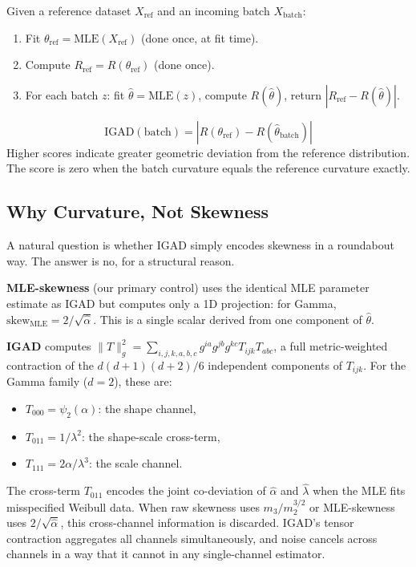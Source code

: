 \documentclass[12pt]{article}
\begin{document}
Given a reference dataset $X_{\mathrm{ref}}$ and an incoming batch
$X_{\mathrm{batch}}$:
\begin{enumerate}
  \item Fit $\theta_{\mathrm{ref}} = \mathrm{MLE}(X_{\mathrm{ref}})$ (done once, at fit time).
  \item Compute $R_{\mathrm{ref}} = R(\theta_{\mathrm{ref}})$ (done once).
  \item For each batch $z$: fit $\hat{\theta} = \mathrm{MLE}(z)$, compute
        $R(\hat{\theta})$, return $|R_{\mathrm{ref}} - R(\hat{\theta})|$.
\end{enumerate}
\[
  \boxed{\mathrm{IGAD}(\text{batch}) = |R(\theta_{\mathrm{ref}}) - R(\hat{\theta}_{\mathrm{batch}})|}
\]
Higher scores indicate greater geometric deviation from the reference
distribution. The score is zero when the batch curvature equals the reference
curvature exactly.

\subsection{Why Curvature, Not Skewness}
\label{sec:why-curvature}

A natural question is whether IGAD simply encodes skewness in a roundabout way.
The answer is no, for a structural reason.

\textbf{MLE-skewness} (our primary control) uses the identical MLE parameter
estimate as IGAD but computes only a 1D projection: for Gamma,
$\mathrm{skew}_{\mathrm{MLE}} = 2/\sqrt{\hat{\alpha}}$. This is a single scalar
derived from one component of $\hat{\theta}$.

\textbf{IGAD} computes
$\|T\|^2_g = \sum_{i,j,k,a,b,c} g^{ia}g^{jb}g^{kc}T_{ijk}T_{abc}$, a full
metric-weighted contraction of the $d(d+1)(d+2)/6$ independent components of
$T_{ijk}$. For the Gamma family ($d=2$), these are:
\begin{itemize}
  \item $T_{000} = \psi_2(\alpha)$: the shape channel,
  \item $T_{011} = 1/\lambda^2$: the shape-scale cross-term,
  \item $T_{111} = 2\alpha/\lambda^3$: the scale channel.
\end{itemize}
The cross-term $T_{011}$ encodes the joint co-deviation of $\hat{\alpha}$ and
$\hat{\lambda}$ when the MLE fits misspecified Weibull data. When raw skewness
uses $m_3/m_2^{3/2}$ or MLE-skewness uses $2/\sqrt{\hat{\alpha}}$, this
cross-channel information is discarded. IGAD's tensor contraction aggregates all
channels simultaneously, and noise cancels across channels in a way that it
cannot in any single-channel estimator.
\end{document}
